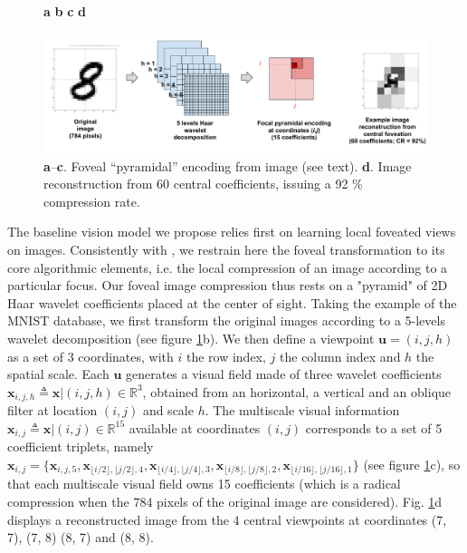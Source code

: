 \documentclass[12pt,twoside,openright]{article}
\begin{document}
\begin{figure}[b!]
	\centerline{
		\hspace{2cm}
		\textbf{a}
		\hspace{4cm}
		\textbf{b}	
		\hspace{3cm}
		\textbf{c}
		\hspace{3cm}
		\textbf{d}
		\hspace{2cm}			
	}
	\centerline{
		\includegraphics[width = \linewidth]{img/ICLR-foveated-model.pdf} 
	}
	
	\caption{\textbf{a}--\textbf{c}. Foveal ``pyramidal'' encoding from image (see text).
		\textbf{d}. Image reconstruction from 60 central coefficients, issuing a 92 \% compression rate.  
		}\label{fig:foveated}
\end{figure}

The baseline vision model we propose relies first on learning local foveated views on images.
Consistently with \citep{kortum1996implementation,wang2003foveation}, we restrain here the foveal transformation to its core algorithmic elements, i.e. the local compression of an image according to a particular focus. Our foveal image compression thus rests on a "pyramid" of 2D Haar wavelet coefficients placed at the center of sight. Taking the example of the MNIST database, we first transform the original images according to a 5-levels wavelet decomposition (see figure \ref{fig:foveated}b). We then define a viewpoint $\boldsymbol{u} = (i,j,h)$ as a set of 3 coordinates, with $i$ the row index, $j$ the column index and $h$ the spatial scale. Each $\boldsymbol{u}$ generates a visual field made of three wavelet coefficients $\boldsymbol{x}_{i,j,h} \triangleq\boldsymbol{x}|(i,j,h) \in \mathbb{R}^3$, obtained from an horizontal, a vertical and an oblique filter at location $(i,j)$ and scale $h$.  The multiscale visual information $\boldsymbol{x}_{i,j}\triangleq\boldsymbol{x}|(i,j) \in \mathbb{R}^{15}$ available at coordinates $(i,j)$ corresponds to a set of 5 coefficient triplets, namely $\boldsymbol{x}_{i,j}=\{\boldsymbol{x}_{i,j,5}, \boldsymbol{x}_{\lfloor i/2\rfloor,\lfloor j/2\rfloor,4}, \boldsymbol{x}_{\lfloor i/4\rfloor,\lfloor j/4\rfloor,3}, \boldsymbol{x}_{\lfloor i/8\rfloor,\lfloor j/8\rfloor, 2}, \boldsymbol{x}_{\lfloor i/16\rfloor,\lfloor j/16\rfloor, 1}\}$ (see figure \ref{fig:foveated}c), so that each multiscale visual field owns 15 coefficients (which is a radical compression when the 784 pixels of the original image are considered).
Fig. \ref{fig:foveated}d displays a reconstructed image from the 4 central viewpoints at coordinates (7, 7), (7, 8) (8, 7) and (8, 8).
\end{document}
